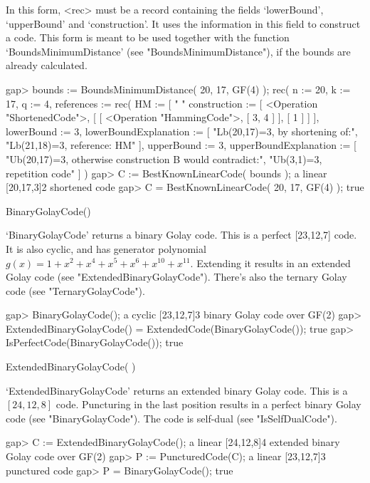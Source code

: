 In this form, <rec> must be a record  containing the fields `lowerBound',
`upperBound' and `construction'. It uses the information in this field to
construct a code.   This form is   meant to  be  used together  with  the
function `BoundsMinimumDistance'    (see "BoundsMinimumDistance"), if the
bounds are already calculated.

\beginexample
gap> bounds := BoundsMinimumDistance( 20, 17, GF(4) );
rec( n := 20, k := 17, q := 4, 
  references := rec( HM := [ "%
          "%
  construction := [ <Operation "ShortenedCode">, 
      [ [ <Operation "HammingCode">, [ 3, 4 ] ], [ 1 ] ] ], lowerBound := 3, 
  lowerBoundExplanation := [ "Lb(20,17)=3, by shortening of:", 
      "Lb(21,18)=3, reference: HM" ], upperBound := 3, 
  upperBoundExplanation := 
    [ "Ub(20,17)=3, otherwise construction B would contradict:", 
      "Ub(3,1)=3, repetition code" ] )
gap> C := BestKnownLinearCode( bounds );
a linear [20,17,3]2 shortened code
gap> C = BestKnownLinearCode( 20, 17, GF(4) );
true 
\endexample


\>BinaryGolayCode()

`BinaryGolayCode'  returns   a binary  Golay   code. This  is   a perfect
[23,12,7]  code. It  is  also    cyclic,  and has  generator   polynomial
$g(x)=1+x^2+x^4+x^5+x^6+x^{10}+x^{11}$.  Extending  it    results   in an
extended Golay code (see  "ExtendedBinaryGolayCode").  There's  also  the
ternary Golay code (see "TernaryGolayCode").

\beginexample
gap> BinaryGolayCode();
a cyclic [23,12,7]3 binary Golay code over GF(2)
gap> ExtendedBinaryGolayCode() = ExtendedCode(BinaryGolayCode());
true
gap> IsPerfectCode(BinaryGolayCode());
true 
\endexample

\>ExtendedBinaryGolayCode( )

`ExtendedBinaryGolayCode' returns an extended binary  Golay code. This is
a $[24,12,8]$ code. Puncturing in the last  position results in a perfect
binary Golay  code (see "BinaryGolayCode").  The  code is  self-dual (see
"IsSelfDualCode").

\beginexample
gap> C := ExtendedBinaryGolayCode();
a linear [24,12,8]4 extended binary Golay code over GF(2)
gap> P := PuncturedCode(C);
a linear [23,12,7]3 punctured code
gap> P = BinaryGolayCode();
true 
\endexample

